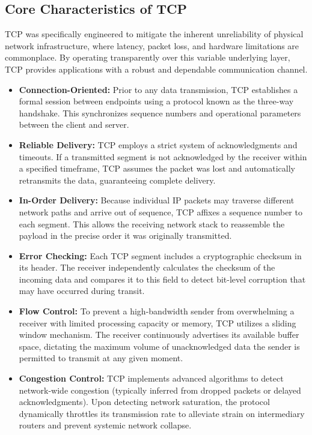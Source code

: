 \subsection{Core Characteristics of TCP}
TCP was specifically engineered to mitigate the inherent unreliability of physical network infrastructure, where latency, packet loss, and hardware limitations are commonplace. By operating transparently over this variable underlying layer, TCP provides applications with a robust and dependable communication channel.
\begin{itemize}
\item \textbf{Connection-Oriented:} Prior to any data transmission, TCP establishes a formal session between endpoints using a protocol known as the three-way handshake. This synchronizes sequence numbers and operational parameters between the client and server.
\item \textbf{Reliable Delivery:} TCP employs a strict system of acknowledgments and timeouts. If a transmitted segment is not acknowledged by the receiver within a specified timeframe, TCP assumes the packet was lost and automatically retransmits the data, guaranteeing complete delivery.
\item \textbf{In-Order Delivery:} Because individual IP packets may traverse different network paths and arrive out of sequence, TCP affixes a sequence number to each segment. This allows the receiving network stack to reassemble the payload in the precise order it was originally transmitted.
\item \textbf{Error Checking:} Each TCP segment includes a cryptographic checksum in its header. The receiver independently calculates the checksum of the incoming data and compares it to this field to detect bit-level corruption that may have occurred during transit.
\item \textbf{Flow Control:} To prevent a high-bandwidth sender from overwhelming a receiver with limited processing capacity or memory, TCP utilizes a sliding window mechanism. The receiver continuously advertises its available buffer space, dictating the maximum volume of unacknowledged data the sender is permitted to transmit at any given moment.
\item \textbf{Congestion Control:} TCP implements advanced algorithms to detect network-wide congestion (typically inferred from dropped packets or delayed acknowledgments). Upon detecting network saturation, the protocol dynamically throttles its transmission rate to alleviate strain on intermediary routers and prevent systemic network collapse.
\end{itemize}



